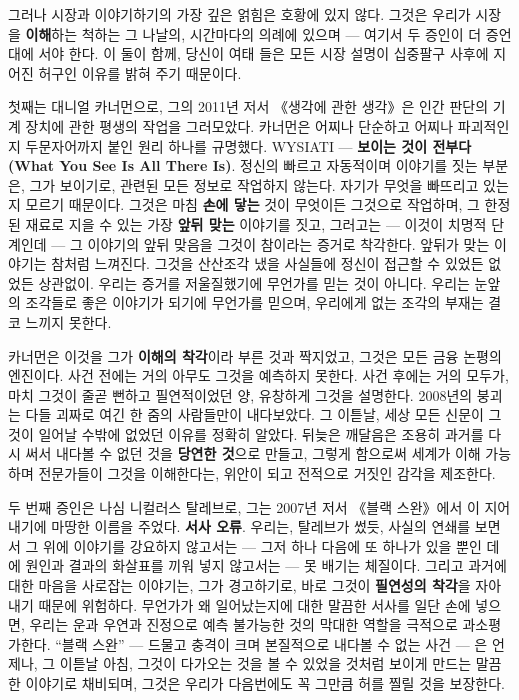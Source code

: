 그러나 시장과 이야기하기의 가장 깊은 얽힘은 호황에 있지 않다. 그것은 우리가 시장을 \textbf{이해}하는 척하는 그 나날의, 시간마다의 의례에 있으며 — 여기서 두 증인이 더 증언대에 서야 한다. 이 둘이 함께, 당신이 여태 들은 모든 시장 설명이 십중팔구 사후에 지어진 허구인 이유를 밝혀 주기 때문이다.

첫째는 대니얼 카너먼으로, 그의 2011년 저서 《생각에 관한 생각》은 인간 판단의 기계 장치에 관한 평생의 작업을 그러모았다. 카너먼은 어찌나 단순하고 어찌나 파괴적인지 두문자어까지 붙인 원리 하나를 규명했다. WYSIATI — \textbf{보이는 것이 전부다(What You See Is All There Is)}. 정신의 빠르고 자동적이며 이야기를 짓는 부분은, 그가 보이기로, 관련된 모든 정보로 작업하지 않는다. 자기가 무엇을 빠뜨리고 있는지 모르기 때문이다. 그것은 마침 \textbf{손에 닿는} 것이 무엇이든 그것으로 작업하며, 그 한정된 재료로 지을 수 있는 가장 \textbf{앞뒤 맞는} 이야기를 짓고, 그러고는 — 이것이 치명적 단계인데 — 그 이야기의 앞뒤 맞음을 그것이 참이라는 증거로 착각한다. 앞뒤가 맞는 이야기는 참처럼 느껴진다. 그것을 산산조각 냈을 사실들에 정신이 접근할 수 있었든 없었든 상관없이. 우리는 증거를 저울질했기에 무언가를 믿는 것이 아니다. 우리는 눈앞의 조각들로 좋은 이야기가 되기에 무언가를 믿으며, 우리에게 없는 조각의 부재는 결코 느끼지 못한다.

카너먼은 이것을 그가 \textbf{이해의 착각}이라 부른 것과 짝지었고, 그것은 모든 금융 논평의 엔진이다. 사건 전에는 거의 아무도 그것을 예측하지 못한다. 사건 후에는 거의 모두가, 마치 그것이 줄곧 뻔하고 필연적이었던 양, 유창하게 그것을 설명한다. 2008년의 붕괴는 다들 괴짜로 여긴 한 줌의 사람들만이 내다보았다. 그 이튿날, 세상 모든 신문이 그것이 일어날 수밖에 없었던 이유를 정확히 알았다. 뒤늦은 깨달음은 조용히 과거를 다시 써서 내다볼 수 없던 것을 \textbf{당연한 것}으로 만들고, 그렇게 함으로써 세계가 이해 가능하며 전문가들이 그것을 이해한다는, 위안이 되고 전적으로 거짓인 감각을 제조한다.

두 번째 증인은 나심 니컬러스 탈레브로, 그는 2007년 저서 《블랙 스완》에서 이 지어내기에 마땅한 이름을 주었다. \textbf{서사 오류}. 우리는, 탈레브가 썼듯, 사실의 연쇄를 보면서 그 위에 이야기를 강요하지 않고서는 — 그저 하나 다음에 또 하나가 있을 뿐인 데에 원인과 결과의 화살표를 끼워 넣지 않고서는 — 못 배기는 체질이다. 그리고 과거에 대한 마음을 사로잡는 이야기는, 그가 경고하기로, 바로 그것이 \textbf{필연성의 착각}을 자아내기 때문에 위험하다. 무언가가 왜 일어났는지에 대한 말끔한 서사를 일단 손에 넣으면, 우리는 운과 우연과 진정으로 예측 불가능한 것의 막대한 역할을 극적으로 과소평가한다. ``블랙 스완'' — 드물고 충격이 크며 본질적으로 내다볼 수 없는 사건 — 은 언제나, 그 이튿날 아침, 그것이 다가오는 것을 볼 수 있었을 것처럼 보이게 만드는 말끔한 이야기로 채비되며, 그것은 우리가 다음번에도 꼭 그만큼 허를 찔릴 것을 보장한다.


